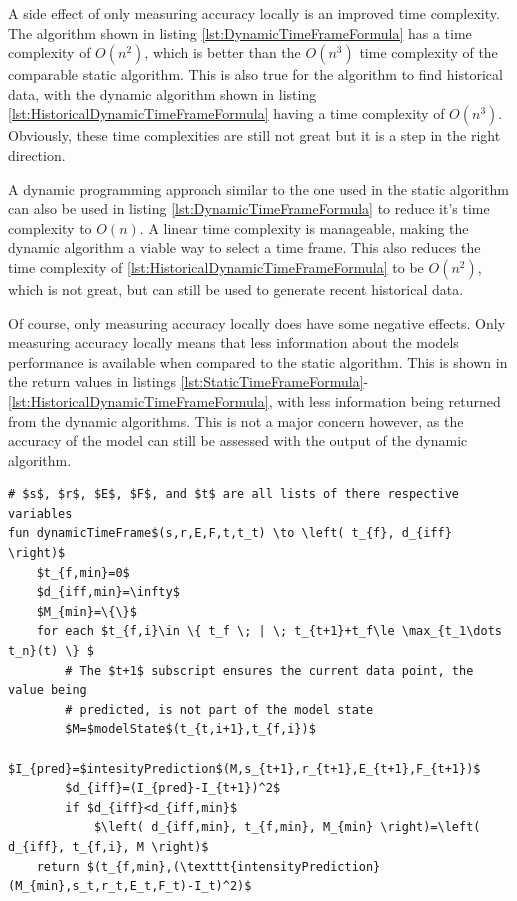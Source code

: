 A side effect of only measuring accuracy locally is an improved time complexity. The algorithm shown in listing \ref{lst:DynamicTimeFrameFormula} has a time complexity of $O(n^2)$, which is better than the $O(n^3)$ time complexity of the comparable static algorithm. This is also true for the algorithm to find historical data, with the dynamic algorithm shown in listing \ref{lst:HistoricalDynamicTimeFrameFormula} having a time complexity of $O(n^3)$. Obviously, these time complexities are still not great but it is a step in the right direction.

A dynamic programming approach similar to the one used in the static algorithm can also be used in listing \ref{lst:DynamicTimeFrameFormula} to reduce it's time complexity to $O(n)$. A linear time complexity is manageable, making the dynamic algorithm a viable way to select a time frame. This also reduces the time complexity of \ref{lst:HistoricalDynamicTimeFrameFormula} to be $O(n^2)$, which is not great, but can still be used to generate recent historical data.

Of course, only measuring accuracy locally does have some negative effects. Only measuring accuracy locally means that less information about the models performance is available when compared to the static algorithm. This is shown in the return values in listings \ref{lst:StaticTimeFrameFormula}-\ref{lst:HistoricalDynamicTimeFrameFormula}, with less information being returned from the dynamic algorithms. This is not a major concern however, as the accuracy of the model can still be assessed with the output of the dynamic algorithm.

\begin{minipage}{\linewidth}
\begin{lstlisting}[caption={The algorithm that describes how to exhaustively find a dynamic time frame's length such that it minimizes the models error.},label={lst:DynamicTimeFrameFormula},mathescape=true]
# $s$, $r$, $E$, $F$, and $t$ are all lists of there respective variables
fun dynamicTimeFrame$(s,r,E,F,t,t_t) \to \left( t_{f}, d_{iff} \right)$
    $t_{f,min}=0$
    $d_{iff,min}=\infty$
    $M_{min}=\{\}$
    for each $t_{f,i}\in \{ t_f \; | \; t_{t+1}+t_f\le \max_{t_1\dots t_n}(t) \} $
        # The $t+1$ subscript ensures the current data point, the value being
        # predicted, is not part of the model state
        $M=$modelState$(t_{t,i+1},t_{f,i})$
        $I_{pred}=$intesityPrediction$(M,s_{t+1},r_{t+1},E_{t+1},F_{t+1})$
        $d_{iff}=(I_{pred}-I_{t+1})^2$
        if $d_{iff}<d_{iff,min}$
            $\left( d_{iff,min}, t_{f,min}, M_{min} \right)=\left(  d_{iff}, t_{f,i}, M \right)$
    return $(t_{f,min},(\texttt{intensityPrediction}(M_{min},s_t,r_t,E_t,F_t)-I_t)^2)$
\end{lstlisting}
\end{minipage}

